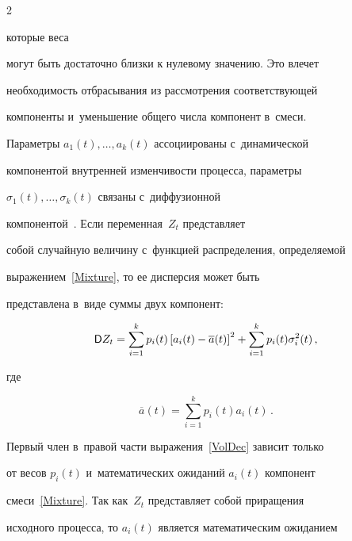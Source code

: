 \begin{multicols}{2}





\noindent


которые веса


могут быть достаточно близки к нулевому значению. Это влечет


необходимость отбрасывания из рассмотрения соответствующей


компоненты и~уменьшение общего числа компонент в~смеси.





Параметры $a_{1}(t),\ldots,a_{k}(t)$ ассоциированы с~динамической


компонентой внутренней изменчи\-вости процесса, параметры


$\sigma_{1}(t),\ldots,\sigma_{k}(t)$  связаны с~диффузионной


компонентой~\cite{Korolev2011}. Если переменная~$Z_t$ представляет


собой случайную величину с~функцией распределения, определяемой


выражением~\eqref{Mixture}, то ее дисперсия может быть


представлена в~виде суммы двух компонент:


\begin{equation}


\label{VolDec}


{\sf D}Z_t=\sum\limits_{i=1}^{k}p_i(t)\left[a_i(t)-\overline


a(t)\right]^2+\sum\limits_{i=1}^{k}p_i(t)\sigma_i^2(t)\,,


\end{equation}


где


\begin{equation*}


\overline a(t)=\sum\limits_{i=1}^{k}p_i(t)a_i(t)\,.


\end{equation*}





Первый член в~правой части выражения~\eqref{VolDec} зависит только


от весов $p_i(t)$ и~математических ожиданий $a_i(t)$ компонент


смеси~\eqref{Mixture}. Так как~$Z_t$ представляет собой приращения


исходного процесса, то $a_i(t)$ является математическим ожиданием



\end{multicols}
